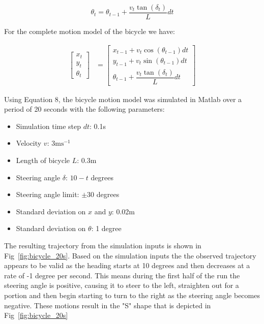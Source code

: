 \documentclass{article}
\begin{document}
\begin{equation}
	\theta_{t} = \theta_{t - 1} + \dfrac{v_{t} \tan(\delta_{t})}{L} dt
\end{equation}

For the complete motion model of the bicycle we have:

\begin{align}
 	\begin{bmatrix}
        x_{t} \\
        y_{t} \\
        \theta_{t}
    \end{bmatrix}  
    &=
    \begin{bmatrix}
	    x_{t - 1} + v_{t} \cos(\theta_{t - 1}) dt \\
		y_{t - 1} + v_{t} \sin(\theta_{t - 1}) dt \\
		\theta_{t - 1} + \dfrac{v_{t} \tan(\delta_{t})}{L} dt
    \end{bmatrix}
\end{align}

Using Equation 8, the bicycle motion model was simulated in Matlab over a period of 20 seconds with the following parameters:

\begin{itemize}	
	\vspace{-0.4cm}
	\setlength{\itemsep}{0pt}
	\setlength{\parskip}{0pt}
	\setlength{\parsep}{0pt}
	
	\item{Simulation time step $dt$: 0.1s}
	\item{Velocity $v$: $3 \text{ms}^{-1}$}
	\item{Length of bicycle $L$: 0.3m}
	\item{Steering angle $\delta$: $10 - t$ degrees}
	\item{Steering angle limit: $\pm 30$ degrees}
	\item{Standard deviation on $x$ and $y$: 0.02m}
	\item{Standard deviation on $\theta$: 1 degree}
\end{itemize}

The resulting trajectory from the simulation inputs is shown in Fig~\ref{fig:bicycle_20s}. Based on the simulation inputs the the observed trajectory appears to be valid as the heading starts at 10 degrees and then decreases at a rate of -1 degree per second. This means during the first half of the run the steering angle is positive, causing it to steer to the left, straighten out for a portion and then begin starting to turn to the right as the steering angle becomes negative. These motions result in the "S" shape that is depicted in  Fig~\ref{fig:bicycle_20s}
\end{document}
